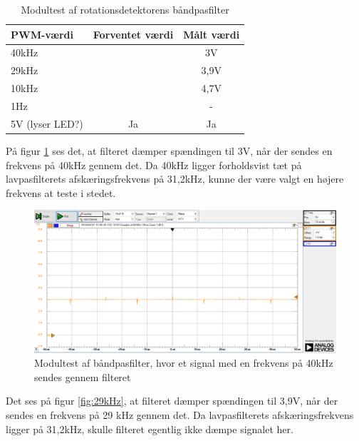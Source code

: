 \begin{table}[H]
	\centering
	\begin{tabular}{|l|c|c|}
		\hline
		\textbf{PWM-værdi} & \textbf{Forventet værdi} & \textbf{Målt værdi} \\ \hline
		40kHz              & \multicolumn{1}{l|}{}    & 3V                  \\ \hline
		29kHz              & \multicolumn{1}{l|}{}    & 3,9V                \\ \hline
		10kHz              & \multicolumn{1}{l|}{}    & 4,7V                \\ \hline
		1Hz               & \multicolumn{1}{l|}{}    & -                   \\ \hline
		5V (lyser LED?)    & Ja                       & Ja                  \\ \hline
	\end{tabular}
	\caption{Modultest af rotationsdetektorens båndpasfilter}
	\label{table:baandpasfiltertest}
\end{table}

\noindent På figur \ref{fig:40kHz} ses det, at filteret dæmper spændingen til 3V, når der sendes en frekvens på 40kHz gennem det. Da 40kHz ligger forholdsvist tæt på lavpasfilterets afskæringsfrekvens på 31,2kHz, kunne der være valgt en højere frekvens at teste i stedet. 

\begin{figure}[H]
	\centering
	\includegraphics[width=\textwidth]{Test/images/AffyringTest/BaandpasfilterTest/40kHz}
	\caption{Modultest af båndpasfilter, hvor et signal med en frekvens på 40kHz sendes gennem filteret}
	\label{fig:40kHz}
\end{figure}

\noindent Det ses på figur \ref{fig:29kHz}, at filteret dæmper spændingen til 3,9V, når der sendes en frekvens på 29 kHz gennem det. Da lavpasfilterets afskæringsfrekvens ligger på 31,2kHz, skulle filteret egentlig ikke dæmpe signalet her. 

